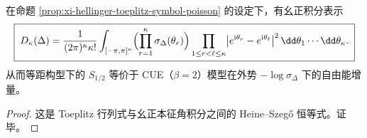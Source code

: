 \begin{proposition}\label{prop:xi-hellinger-toeplitz-heine-szego-cue}
在命题 \ref{prop:xi-hellinger-toeplitz-symbol-poisson} 的设定下，有幺正积分表示
\[
\boxed{\;
D_\kappa(\Delta)
=\frac{1}{(2\pi)^\kappa\kappa!}
\int_{[-\pi,\pi]^\kappa}
\Bigl(\prod_{r=1}^{\kappa}\sigma_\Delta(\theta_r)\Bigr)
\prod_{1\le r<\ell\le\kappa}\bigl|e^{\mathrm{i}\theta_r}-e^{\mathrm{i}\theta_\ell}\bigr|^2\,
\dd\theta_1\cdots\dd\theta_\kappa.\;}
\]
从而等距构型下的 \(S_{1/2}\) 等价于 CUE（\(\beta=2\)）模型在外势 \(-\log\sigma_\Delta\) 下的自由能增量。
\end{proposition}
\begin{proof}
这是 Toeplitz 行列式与幺正本征角积分之间的 Heine--Szeg\H{o} 恒等式。证毕。
\end{proof}


